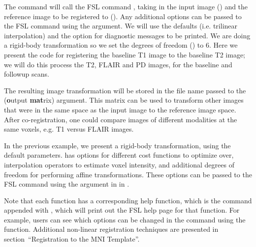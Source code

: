 The  command  will call the FSL command , taking in the input image () and the reference image to be registered to ().  Any additional options can be passed to the FSL command using the  argument.  We will use the defaults (i.e. trilinear interpolation) and the  option for diagnostic messages to be printed.  We are doing a rigid-body transformation so we set the degrees of freedom () to 6. Here we present the code for registering the baseline T1 image to the baseline T2 image; we will do this process the T2, FLAIR and PD images, for the baseline and followup scans. 
\begin{knitrout}
\color{fgcolor}\begin{kframe}
\begin{alltt}
\hlstd{(} \hlstd{=} \hlstd{,}
         \hlstd{=} \hlstd{,}
         \hlstd{=} \hlstd{,}
         \hlstd{=} \hlstd{,}
         \hlstd{=} \hlstd{,}  \hlstd{=} \hlstd{)}
\end{alltt}
\end{kframe}
\end{knitrout}



The resulting image transformation will be stored in the file name passed to the  ({\bf o}utput {\bf mat}rix) argument.  This matrix can be used to transform other images that were in the same space as the input image to the reference image space.  After co-registration, one could compare images of different modalities at the same voxels, e.g. T1 versus FLAIR images.

In the previous example, we present a rigid-body transformation, using the default parameters.   has options for different cost functions to optimize over, interpolation operators to estimate voxel intensity, and additional degrees of freedom for performing affine transformations.  These options can be passed to the FSL  command using the  argument in  in .  

Note that each  function has a corresponding help function, which is the  command appended with , which will print out the FSL help page for that function.  For example, users can see which options can be changed in the  command using the  function.   Additional non-linear registration techniques are presented in section~``Registration to the MNI Template''.  








